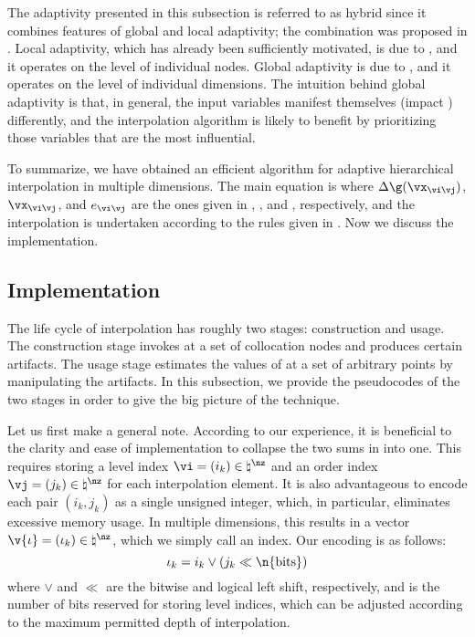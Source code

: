 The adaptivity presented in this subsection is referred to as hybrid since it
combines features of global and local adaptivity; the combination was proposed
in \cite{jakeman2012}. Local adaptivity, which has already been sufficiently
motivated, is due to \cite{ma2009}, and it operates on the level of individual
nodes. Global adaptivity is due to \cite{klimke2006}, and it operates on the
level of individual dimensions. The intuition behind global adaptivity is that,
in general, the input variables manifest themselves (impact \g) differently, and
the interpolation algorithm is likely to benefit by prioritizing those variables
that are the most influential.

To summarize, we have obtained an efficient algorithm for adaptive hierarchical
interpolation in multiple dimensions. The main equation is
 where $\Delta\g(\vx_{\vi \vj})$, $\vx_{\vi \vj}$, and
$e_{\vi \vj}$ are the ones given in ,
, and , respectively, and the
interpolation is undertaken according to the rules given in
. Now we discuss the implementation.

\subsection{Implementation}

The life cycle of interpolation has roughly two stages: construction and usage.
The construction stage invokes \g at a set of collocation nodes and produces
certain artifacts. The usage stage estimates the values of \g at a set of
arbitrary points by manipulating the artifacts. In this subsection, we provide
the pseudocodes of the two stages in order to give the big picture of the
technique.

Let us first make a general note. According to our experience, it is beneficial
to the clarity and ease of implementation to collapse the two sums in
 into one. This requires storing a level index $\vi =
(i_k) \in \natural^\nz$ and an order index $\vj = (j_k) \in \natural^\nz$ for
each interpolation element. It is also advantageous to encode each pair $(i_k,
j_k)$ as a single unsigned integer, which, in particular, eliminates excessive
memory usage. In multiple dimensions, this results in a vector $\v{\iota} =
(\iota_k) \in \natural^\nz$, which we simply call an index. Our encoding is as
follows:
\[
  \iota_k = i_k \lor (j_k \ll \n{\mathrm{bits}})
\]
where $\lor$ and $\ll$ are the bitwise  and logical left shift,
respectively, and  is the number of bits reserved for storing
level indices, which can be adjusted according to the maximum permitted depth of
interpolation.

